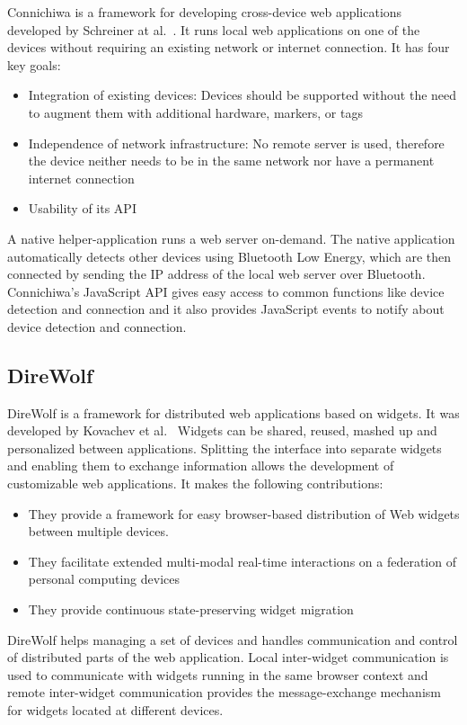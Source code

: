 Connichiwa is a framework for developing cross-device web applications developed by Schreiner at al.~\cite{connichiwa2015}. It runs local web applications on one of the devices without requiring an existing network or internet connection. It has four key goals:
\begin{itemize}
	\item Integration of existing devices: Devices should be supported without the need to augment them with additional hardware, markers, or tags
	\item Independence of network infrastructure: No remote server is used, therefore the device neither needs to be in the same network nor have a permanent internet connection
	\item Usability of its API
\end{itemize}
A native helper-application runs a web server on-demand. The native application automatically detects other devices using Bluetooth Low Energy, which are then connected by sending the IP address of the local web server over Bluetooth. Connichiwa's JavaScript API gives easy access to common functions like device detection and connection and it also provides JavaScript events to notify about device detection and connection.

\subsection{DireWolf}

DireWolf is a framework for distributed web applications based on widgets. It was developed by Kovachev et al.~\cite{direwolf2013} Widgets can be shared, reused, mashed up and personalized between applications. Splitting the interface into separate widgets and enabling them to exchange information allows the development of customizable web applications. It makes the following contributions:
\begin{itemize}
	\item They provide a framework for easy browser-based distribution of Web widgets between multiple devices.
	\item They facilitate extended multi-modal real-time interactions on a federation of personal computing devices
	\item They provide continuous state-preserving widget migration
\end{itemize}
DireWolf helps managing a set of devices and handles communication and control of distributed parts of the web application. Local inter-widget communication is used to communicate with widgets running in the same browser context and remote inter-widget communication provides the message-exchange mechanism for widgets located at different devices.

